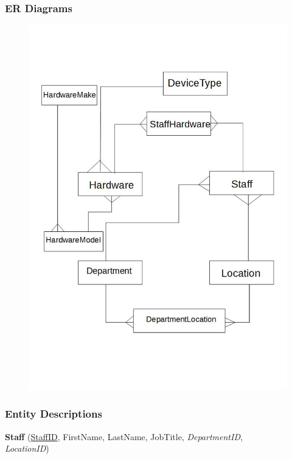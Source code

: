 \newpage

\subsubsection{ER Diagrams}

\begin{figure}[H]
\includegraphics[width=\textwidth]{ERNormalisedDiagram.jpg}
\end{figure}


\subsubsection{Entity Descriptions}


\textbf{Staff}  (\underline{StaffID}, FirstName, LastName, JobTitle, \textit{DepartmentID},\\ \textit{ LocationID})


